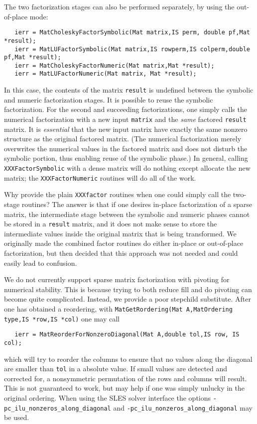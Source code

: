 The 
two  
factorization 
stages  
can also be performed separately, by using the out-of-place mode:
\begin{verbatim}
   ierr = MatCholeskyFactorSymbolic(Mat matrix,IS perm, double pf,Mat *result);
   ierr = MatLUFactorSymbolic(Mat matrix,IS rowperm,IS colperm,double pf,Mat *result);
   ierr = MatCholeskyFactorNumeric(Mat matrix,Mat *result);
   ierr = MatLUFactorNumeric(Mat matrix, Mat *result);
\end{verbatim}
In this case, the contents of the matrix {\tt result} is undefined between 
the symbolic and numeric factorization stages. 
It is possible to reuse the symbolic factorization. For the second and 
succeeding factorizations, one simply calls the numerical factorization with a 
new input {\tt matrix} and the {\em same} factored {\tt result} matrix.
It is {\em essential} that the new input matrix 
have   %
exactly the same nonzero structure as the original factored matrix.
(The numerical factorization merely overwrites the numerical values in the 
factored matrix and does not disturb the symbolic portion, thus enabling
reuse of the symbolic phase.)
In general, calling {\tt XXXFactorSymbolic} with a dense matrix will 
do nothing except allocate the new matrix; the {\tt XXXFactorNumeric} 
routines will do all of the work. 

Why provide the plain {\tt XXXfactor} routines when one could simply 
call the two-stage routines? The answer is that if one desires in-place 
factorization of a sparse matrix, the intermediate stage between the 
symbolic and numeric phases cannot be stored in a {\tt result} matrix, and
it does not make sense to store the intermediate values
inside the original matrix 
that is being transformed.  We originally made the combined factor routines
do either in-place or out-of-place factorization, but then decided that 
this approach was not needed and could easily lead to confusion.

We do not currently support sparse matrix factorization with pivoting
for numerical stability. This is because trying to both reduce fill
and do pivoting can become quite complicated. Instead, we provide a 
poor stepchild substitute. After one has obtained a reordering, with
{\tt MatGetRordering(Mat A,MatOrdering type,IS *row,IS *col)} one
may call
\begin{verbatim}
   ierr = MatReorderForNonzeroDiagonal(Mat A,double tol,IS row, IS col);
\end{verbatim}
which will try to reorder the columns to ensure that no values along 
the diagonal are smaller than {\tt tol} in a absolute value. If small 
values are detected and corrected for, a nonsymmetric
permutation of the rows and columns will result. This is not guaranteed to work, 
but may help if one was simply unlucky in the original ordering.
 When using the SLES solver interface
the options {\tt -pc\_ilu\_nonzeros\_along\_diagonal} 
and 
{\tt -pc\_ilu\_nonzeros\_along\_diagonal} may be used.

